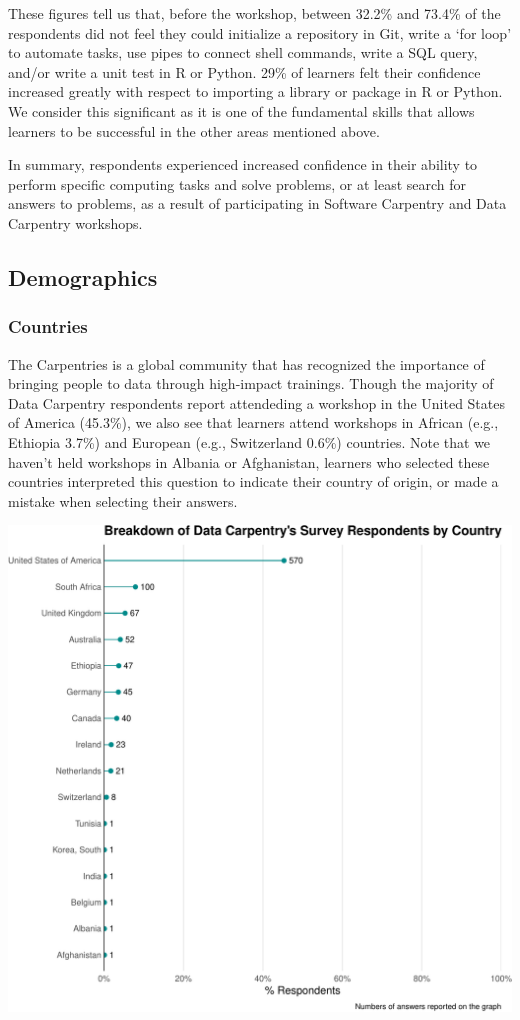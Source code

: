 \documentclass[]{article}
\makeatletter
\def\maxwidth{\ifdim\Gin@nat@width>\linewidth\linewidth\else\Gin@nat@width\fi}
\makeatother
\begin{document}
These figures tell us that, before the workshop, between 32.2\% and
73.4\% of the respondents did not feel they could initialize a
repository in Git, write a `for loop' to automate tasks, use pipes to
connect shell commands, write a SQL query, and/or write a unit test in R
or Python. 29\% of learners felt their confidence increased greatly with
respect to importing a library or package in R or Python. We consider
this significant as it is one of the fundamental skills that allows
learners to be successful in the other areas mentioned above.

In summary, respondents experienced increased confidence in their
ability to perform specific computing tasks and solve problems, or at
least search for answers to problems, as a result of participating in
Software Carpentry and Data Carpentry workshops.

\subsection{Demographics}\label{demographics}

\subsubsection{Countries}\label{countries}

The Carpentries is a global community that has recognized the importance
of bringing people to data through high-impact trainings. Though the
majority of Data Carpentry respondents report attendeding a workshop in
the United States of America (45.3\%), we also see that learners attend
workshops in African (e.g., Ethiopia 3.7\%) and European (e.g.,
Switzerland 0.6\%) countries. Note that we haven't held workshops in
Albania or Afghanistan, learners who selected these countries
interpreted this question to indicate their country of origin, or made a
mistake when selecting their answers.

\includegraphics[width=\maxwidth]{../figures/dc-country-workshop-plot-1}
\end{document}
